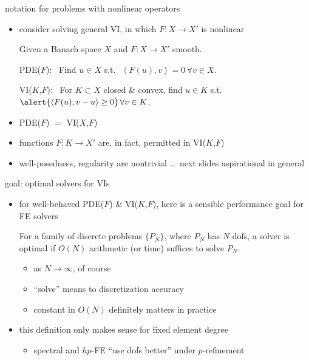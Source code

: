\documentclass[aspectratio=169,10pt]{beamer}
\newcommand{\ip}[2]{\left\langle #1, #2 \right\rangle}
\newcommand{\lc}{{\text{\large $\circ$}}}
\newcommand{\pcomm}[1]{\grey{\small (#1)}}
\begin{document}
\begin{frame}{notation for problems with nonlinear operators}

\begin{itemize}
\item consider solving general VI, in which $F:X \to X'$ is \alert{nonlinear}

\smallskip
\begin{definitions}
Given a Banach space $X$ and $F: X\to X'$ smooth.

\smallskip
\alert{PDE($F$)}: \,  Find $u\in X$ s.t.~\,$\ip{F(u)}{v}=0 \, \forall v\in X$.

\smallskip
\alert{VI($K$,$F$)}: \, For $K\subset X$ closed \& convex, find $u\in K$ s.t.~\,$\alert{\ip{F(u)}{v-u} \ge 0} \, \forall v\in K$.
\end{definitions}

\smallskip
\item PDE($F$) $=$ VI($X$,$F$)
\item functions \alert{$F: K\to X'$} are, in fact, permitted in VI($K$,$F$)

\smallskip
\item well-posedness, regularity are nontrivial \dots \, next slides aspirational in general
\end{itemize}
\end{frame}


\begin{frame}{goal: optimal solvers for VIs}

\begin{itemize}
\item for well-behaved PDE($F$) \& VI($K$,$F$), here is a sensible performance \alert{goal} for FE solvers

\begin{definition}
For a family of discrete problems $\{P_N\}$, where $P_N$ has $N$ dofs, a solver is \alert{optimal} if $O(N)$ arithmetic (or time) suffices to solve $P_N$.
\end{definition}

    \begin{itemize}
    \item[$\lc$] as $N\to\infty$, of course
    \item[$\lc$] ``solve'' means to discretization accuracy
    \item[$\lc$] \alert{constant in $O(N)$ definitely matters in practice}
    \end{itemize}

\item this definition only makes sense for fixed element degree \hfill \pcomm{$P_1$ in examples}
    \begin{itemize}
    \item[$\lc$] spectral and $hp$-FE ``use dofs better'' under $p$-refinement
    \end{itemize}
\end{itemize}
\end{frame}
\end{document}

